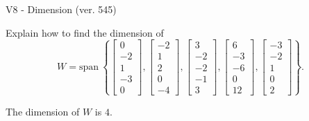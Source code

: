 \begin{exercise}
  \begin{exerciseTitle}V8 - Dimension (ver. 545)\end{exerciseTitle}
  \begin{exerciseStatement}
    Explain how to find the dimension of 
\[W=\mathrm{span}\ \left\{\left[\begin{array}{r}
0 \\
-2 \\
1 \\
-3 \\
0
\end{array}\right] , \left[\begin{array}{r}
-2 \\
1 \\
2 \\
0 \\
-4
\end{array}\right] , \left[\begin{array}{r}
3 \\
-2 \\
-2 \\
-1 \\
3
\end{array}\right] , \left[\begin{array}{r}
6 \\
-3 \\
-6 \\
0 \\
12
\end{array}\right] , \left[\begin{array}{r}
-3 \\
-2 \\
1 \\
0 \\
2
\end{array}\right]\right\}.\]



  \end{exerciseStatement}
  \begin{exerciseAnswer}
   The dimension of \(W\) is  \(4\).
  


  \end{exerciseAnswer}
\end{exercise}